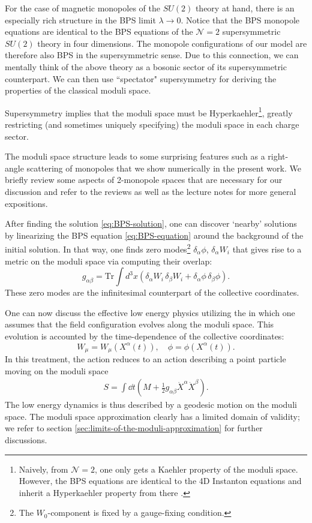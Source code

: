 \documentclass[aps, prd, twocolumn, superscriptaddress, preprintnumbers, nofootinbib, longbibliography]{revtex4-1}
\begin{document}
For the case of magnetic monopoles of the $SU(2)$ theory at hand, there is an especially rich structure in the BPS limit $\lambda \rightarrow 0$. Notice that the BPS monopole equations are identical to the BPS equations of the $\mathcal{N}=2$ supersymmetric 
$SU(2)$ theory in four dimensions. 
The monopole configurations of our model are therefore also BPS in the supersymmetric sense.  Due to this connection,
we can mentally think of the above theory as a bosonic sector of its supersymmetric counterpart.  We can then use 
``spectator" supersymmetry for deriving the properties of the classical moduli space. 

Supersymmetry implies that the moduli space must be Hyperkaehler\footnote{Naively, from $\mathcal{N}=2$, one only gets a Kaehler property of the moduli space. However, the BPS equations are identical to the 4D Instanton equations and inherit a Hyperkaehler property from there \cite{Tong:2005un}.}, greatly restricting (and sometimes uniquely specifying) the moduli space in each charge sector. 

The moduli space structure leads to some surprising features such as a right-angle scattering of monopoles that we 
show numerically in the present work. We briefly review some aspects of 2-monopole spaces that are necessary for our discussion and refer to the reviews \cite{Manton:2004tk, Atiyah-Hitchin1988} as well as the lecture notes \cite{Tong:2005un} for more general expositions. 

After finding the solution \eqref{eq:BPS-solution}, one can discover `nearby' solutions by linearizing the BPS equation \eqref{eq:BPS-equation} around the background of the initial solution. In that way, one finds zero modes\footnote{The $W_0$-component is fixed by a gauge-fixing condition.} $\delta_{\alpha} \phi$,  $\delta_{\alpha} W_{i}$ that gives rise to a metric on the moduli space via computing their overlap:
\begin{equation}
    g_{\alpha \beta} = \text{Tr} \int d^3x (\delta_{\alpha} W_i\, \delta_{\beta} W_i + \delta_{\alpha} \phi \, \delta_{\beta} \phi).
\end{equation}
These zero modes are the infinitesimal counterpart of the collective coordinates.

One can now discuss the effective low energy physics utilizing the  \cite{Manton:1981mp} in which one assumes that the field configuration evolves along the moduli space. This evolution is accounted by the time-dependence of the collective coordinates:
\begin{equation}
    W_{\mu} = W_{\mu}(X^{\alpha}(t)), \quad \phi=\phi(X^{\alpha}(t)). 
\end{equation}
In this treatment, the action reduces to an action describing a point particle moving on the moduli space
\begin{align}
    S=\int \dd t \left(M+\frac{1}{2} g_{\alpha \beta}\dot{X}^\alpha \dot{X}^\beta \right). 
\end{align}
The low energy dynamics is thus described by a geodesic motion on the moduli space. 
The moduli space approximation clearly has a 
limited domain of validity; we refer to section \ref{sec:limits-of-the-moduli-approximation} for further discussions. 
\end{document}
